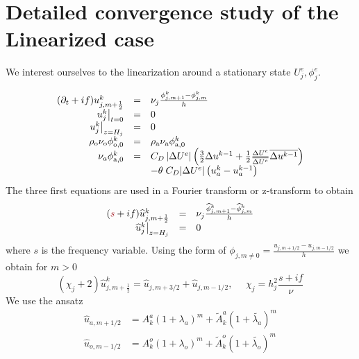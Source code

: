 \section{Detailed convergence study of the Linearized case}
\label{appendix:OASchwarz_LinearizedAnalysis}
We interest ourselves to the linearization around a stationary state 
$U^e_j, \phi^e_j$.

\begin{equation*}
\begin{array}{rcll}
	(\partial_t +if) u^{{k}}_{j,m+\frac{1}{2}} &=&
	\nu_j\frac{\phi^{{k}}_{j,m+1} - \phi^{{k}}_{j,m}}{h} \\
	\left.u^{{k}}_j\right|_{t=0} &=& 0 \\
	\left.u^{{k}}_j\right|_{z=H_j} &=& 0\\
	\rho_{\rm o} \nu_{\rm o} \phi^{{k}}_{{\rm o}, 0} &=&
	\rho_{\rm a} \nu_{\rm a} \phi^{{k}}_{{\rm a}, 0} \\
	\nu_a \phi_{{\rm a},0}^{{k}}
	&=& C_D \left|\Delta U^e\right| \left(\frac{3}{2} \Delta u^{
		{k-1}}
	+ \frac{1}{2} \frac{\Delta U^e}{\overline{\Delta U^e}}
		\overline{\Delta u^{
			{{k-1}}}}\right) \\
		&&-{\theta \; C_D|\Delta U^e|
		\left( u_a^{{k}} -
		u_a^{{k-1}}\right)}
\end{array}
\end{equation*}
The three first equations are used in a Fourier transform or
z-transform to obtain
\begin{equation}
\label{eq:FourierTransform}
\begin{array}{rcll}
	(\emphase{s} +if) \widehat{u}^{{k}}_{j,m+\frac{1}{2}} &=&
	\nu_j\frac{\widehat{\phi}^{{k}}_{j,m+1}
	- \widehat{\phi}^{{k}}_{j,m}}{h} \\
	\left.\widehat{u}^{{k}}_j\right|_{z=H_j} &=& 0\\
\end{array}
\end{equation}
where $s$ is the frequency variable.
Using the form of $\phi_{j, m \neq 0} = \frac{u_{j, m+1/2} -
u_{j, m-1/2}}{h}$
we obtain for $m>0$
\begin{equation}
\label{eq:diff_finies_on_u}
	(\chi_j+2) \widehat{u}^{{k}}_{j,m+\frac{1}{2}} =
	\widehat{u}_{j, m+3/2} + \widehat{u}_{j, m-1/2},
	~~~~~~ \chi_j = h_j^2\frac{s + if}{\nu}
\end{equation}
We use the ansatz
\begin{equation*}
\begin{aligned}
\widehat{u}_{a,m+1/2} &= A_k^a (1+\lambda_a)^m
+ \widetilde{A}_k^{a}(1+\widetilde{\lambda_a})^{m} \\
\widehat{u}_{o,m-1/2} &= A_k^o (1+\lambda_o)^{m}
+ \widetilde{A}_k^{o}(1+\widetilde{\lambda_o})^{m}
\end{aligned}
\end{equation*}
